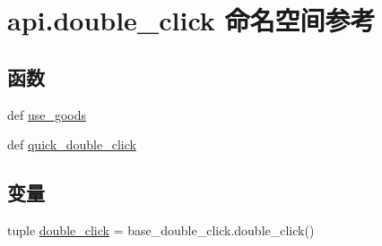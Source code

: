 \hypertarget{namespaceapi_1_1double__click}{\section{api.\-double\-\_\-click 命名空间参考}
\label{namespaceapi_1_1double__click}
}
\subsection*{函数}
\begin{DoxyCompactItemize}
\item 
def \hyperlink{namespaceapi_1_1double__click_ae73b6a73e19960f3fa01eadc3ace7e30}{use\-\_\-goods}
\item 
def \hyperlink{namespaceapi_1_1double__click_a6c98982b5571a3b10898a2cadfc067da}{quick\-\_\-double\-\_\-click}
\end{DoxyCompactItemize}
\subsection*{变量}
\begin{DoxyCompactItemize}
\item 
tuple \hyperlink{namespaceapi_1_1double__click_a7e176c406c07250aa8a83bf02b22af29}{double\-\_\-click} = base\-\_\-double\-\_\-click.\-double\-\_\-click()
\end{DoxyCompactItemize}



